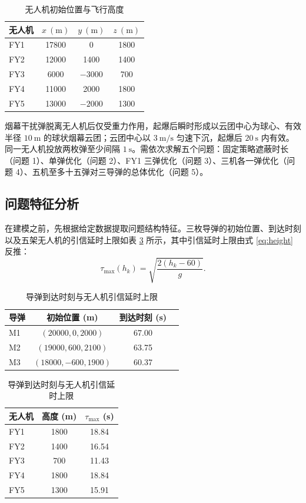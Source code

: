 \documentclass[11pt,a4paper]{ctexart}
\begin{document}
\begin{table}[H]
\centering
\caption{无人机初始位置与飞行高度}
\label{tab:uav}
\begin{tabular}{lccc}
\toprule
无人机 & $x~\mathrm{(m)}$ & $y~\mathrm{(m)}$ & $z~\mathrm{(m)}$ \\
\midrule
FY1 & 17800 & 0 & 1800 \\
FY2 & 12000 & 1400 & 1400 \\
FY3 & 6000 & $-3000$ & 700 \\
FY4 & 11000 & 2000 & 1800 \\
FY5 & 13000 & $-2000$ & 1300 \\
\bottomrule
\end{tabular}
\end{table}

烟幕干扰弹脱离无人机后仅受重力作用，起爆后瞬时形成以云团中心为球心、有效半径 $10~\mathrm{m}$ 的球状烟幕云团；云团中心以 $3~\mathrm{m/s}$ 匀速下沉，起爆后 $20~\mathrm{s}$ 内有效。同一无人机投放两枚弹至少间隔 $1~\mathrm{s}$。需依次求解五个问题：固定策略遮蔽时长（问题 1）、单弹优化（问题 2）、FY1 三弹优化（问题 3）、三机各一弹优化（问题 4）、五机至多十五弹对三导弹的总体优化（问题 5）。

\subsection{问题特征分析}

在建模之前，先根据给定数据提取问题结构特征。三枚导弹的初始位置、到达时刻以及五架无人机的引信延时上限如表 \ref{tab:impact} 所示，其中引信延时上限由式 \eqref{eq:height} 反推：
\begin{equation}
  \tau_{\max}(h_k)=\sqrt{\frac{2(h_k-60)}{g}}.
  \label{eq:taumax}
\end{equation}

\begin{table}[H]
\centering
\caption{导弹到达时刻与无人机引信延时上限}
\label{tab:impact}
\small
\begin{tabular}{lccc}
\toprule
导弹 & 初始位置 (m) & 到达时刻 (s) \\
\midrule
M1 & $(20000,0,2000)$ & 67.00 \\
M2 & $(19000,600,2100)$ & 63.75 \\
M3 & $(18000,-600,1900)$ & 60.37 \\
\bottomrule
\end{tabular}
\qquad
\begin{tabular}{lcc}
\toprule
无人机 & 高度 (m) & $\tau_{\max}$ (s) \\
\midrule
FY1 & 1800 & 18.84 \\
FY2 & 1400 & 16.54 \\
FY3 & 700 & 11.43 \\
FY4 & 1800 & 18.84 \\
FY5 & 1300 & 15.91 \\
\bottomrule
\end{tabular}
\end{table}
\end{document}
